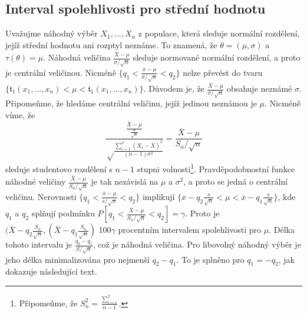 \subsection{Interval spolehlivosti pro střední hodnotu}

Uvažujme náhodný výběr $X_1, ..., X_n$ z populace, která sleduje normální rozdělení, jejíž střední hodnotu ani rozptyl neznáme. To znamená, že $\theta = (\mu, \sigma)$ a $\tau(\theta) = \mu$. Náhodná veličina $\frac{\overline{X} - \mu}{\sigma / \sqrt{n}}$ sleduje normované normální rozdělení, a proto je centrální veličinou. Nicméně $\{q_1 < \frac{\overline{x} - \mu}{\sigma / \sqrt{n}} < q_2 \}$ nelze převést do tvaru $\{\mathfrak{t}_1(x_1, ..., x_n) < \mu < \mathfrak{t}_1(x_1, ..., x_n)\}$. Důvodem je, že $\frac{\overline{X} - \mu}{\sigma / \sqrt{n}}$ obsahuje neznámé $\sigma$. Připomeňme, že hledáme centrální veličinu, jejíž jedinou neznámou je $\mu$. Nicméně víme, že
\begin{equation*}
\frac{\frac{\overline{X} - \mu}{\frac{\sigma}{\sqrt{n}}}}{\sqrt\frac{\sum_{i = 1}^n (X_i - \overline{X})^2}{(n - 1)\sigma^2}} = \frac{\overline{X} - \mu}{S_n / \sqrt{n}}
\end{equation*}
sleduje studentovo rozdělení s $n - 1$ stupni volnosti\footnote{Připomeňme, že $S_n^2 = \frac{\sum_{i = 1}^2}{n - 1}$.}. Pravděpodobnostní funkce náhodné veličiny $\frac{\overline{X} - \mu}{S_n / \sqrt{n}}$ je tak nezávislá na $\mu$ a $\sigma^2$, a proto se jedná o centrální veličinu. Nerovnosti $\{q_1 < \frac{\overline{x} - \mu}{\mathit{s} / \sqrt{n}} < q_2\}$ implikují $\{\overline{x} - q_2\frac{\mathit{s}}{\sqrt{n}} < \mu < \overline{x} - q_1\frac{\mathit{s}}{\sqrt{n}}\}$, kde $q_1$ a $q_2$ splňují podmínku $P[q_1 < \frac{\overline{X} - \mu}{S_n / \sqrt{n}} < q_2] = \gamma$. Proto je $(\overline{X} - q_2 \frac{S_n}{\sqrt{n}}, (\overline{X} - q_1 \frac{S_n}{\sqrt{n}})$ 100$\gamma$ procentním intervalem spolehlivosti pro $\mu$. Délka tohoto intervalu je $\frac{q_2 - q_1}{S / \sqrt{n}}$, což je náhodná veličina. Pro libovolný náhodný výběr je jeho délka minimalizována pro nejmenší $q_2 - q_1$. To je splněno pro $q_1 = - q_2$, jak dokazuje následující text.


